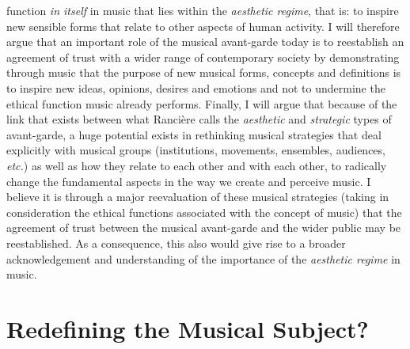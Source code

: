 function \emph{in itself} in music that lies within the \emph{aesthetic regime}, that is: to inspire new sensible forms that relate to other aspects of human activity. I will therefore argue that an important role of the musical avant-garde today is to reestablish an agreement of trust with a wider range of contemporary society by demonstrating through music that the purpose of new musical forms, concepts and definitions is to inspire new ideas, opinions, desires and emotions and not to undermine the ethical function music already performs. Finally, I will argue that because of the link that exists between what Ranci\`{e}re calls the \emph{aesthetic} and \emph{strategic} types of avant-garde, a huge potential exists in rethinking musical strategies that deal explicitly with musical groups (institutions, movements, ensembles, audiences, \emph{etc.}) as well as how they relate to each other and with each other, to radically change the fundamental aspects in the way we create and perceive music. I believe it is through a major reevaluation of these musical strategies (taking in consideration the ethical functions associated with the concept of music) that the agreement of trust between the musical avant-garde and the wider public may be reestablished. As a consequence, this also would give rise to a broader acknowledgement and understanding of the importance of the \emph{aesthetic regime} in music.

\section{Redefining the Musical Subject?}

